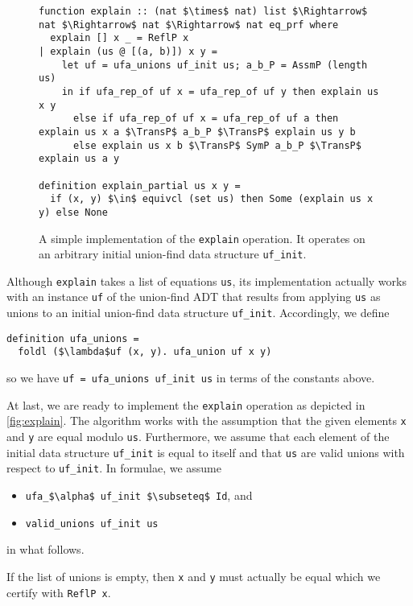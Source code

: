 \documentclass[
  sigplan,
  10pt,
  anonymous,
  review,
  ]{acmart}
\newcommand{\TransP}{\bigtriangledown}
\begin{document}
\begin{figure*}
  \centering
  \begin{lstlisting}
function explain :: (nat $\times$ nat) list $\Rightarrow$ nat $\Rightarrow$ nat $\Rightarrow$ nat eq_prf where
  explain [] x _ = ReflP x
| explain (us @ [(a, b)]) x y =
    let uf = ufa_unions uf_init us; a_b_P = AssmP (length us)
    in if ufa_rep_of uf x = ufa_rep_of uf y then explain us x y
      else if ufa_rep_of uf x = ufa_rep_of uf a then explain us x a $\TransP$ a_b_P $\TransP$ explain us y b
      else explain us x b $\TransP$ SymP a_b_P $\TransP$ explain us a y

definition explain_partial us x y =
  if (x, y) $\in$ equivcl (set us) then Some (explain us x y) else None
  \end{lstlisting}
  \caption{A simple implementation of the \lstinline|explain| operation. It operates on an arbitrary initial union-find data structure \lstinline|uf_init|.\label{fig:explain}}
\end{figure*}
Although \lstinline|explain| takes a list of equations \lstinline|us|, its implementation actually works with an instance \lstinline|uf| of the union-find ADT that results from applying \lstinline|us| as unions to an initial union-find data structure \lstinline|uf_init|.
Accordingly, we define
\begin{lstlisting}
definition ufa_unions =
  foldl ($\lambda$uf (x, y). ufa_union uf x y)
\end{lstlisting}
so we have \lstinline|uf = ufa_unions uf_init us| in terms of the constants above.

At last, we are ready to implement the \lstinline|explain| operation as depicted in \autoref{fig:explain}.
The algorithm works with the assumption that the given elements \lstinline|x| and \lstinline|y| are equal modulo \lstinline|us|.
Furthermore, we assume that each element of the initial data structure \lstinline|uf_init| is equal to itself
and that \lstinline|us| are valid unions with respect to \lstinline|uf_init|.
In formulae, we assume
\begin{itemize}
  \item \lstinline|ufa_$\alpha$ uf_init $\subseteq$ Id|, and
  \item \lstinline|valid_unions uf_init us|
\end{itemize}
in what follows.

If the list of unions is empty, then \lstinline|x| and \lstinline|y| must actually be equal which we certify with \lstinline|ReflP x|.
\end{document}

